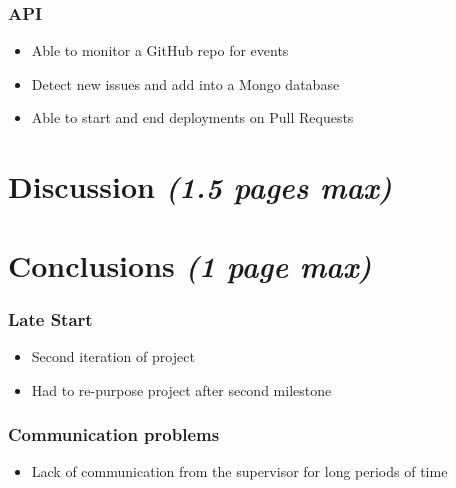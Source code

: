 \documentclass[12pt]{article}
\providecommand{\tightlist}{%
  \setlength{\itemsep}{0pt}\setlength{\parskip}{0pt}}
\begin{document}
\hypertarget{api}{%
\subsubsection{API}\label{api}}

\begin{itemize}
\tightlist
\item
  Able to monitor a GitHub repo for events
\item
  Detect new issues and add into a Mongo database
\item
  Able to start and end deployments on Pull Requests
\end{itemize}

\hypertarget{discussion-1.5-pages-max}{%
\section{\texorpdfstring{Discussion \emph{(1.5 pages
max)}}{Discussion (1.5 pages max)}}\label{discussion-1.5-pages-max}}

\hypertarget{conclusions-1-page-max}{%
\section{\texorpdfstring{Conclusions \emph{(1 page
max)}}{Conclusions (1 page max)}}\label{conclusions-1-page-max}}

\hypertarget{late-start}{%
\subsubsection{Late Start}\label{late-start}}

\begin{itemize}
\tightlist
\item
  Second iteration of project
\item
  Had to re-purpose project after second milestone
\end{itemize}

\hypertarget{communication-problems}{%
\subsubsection{Communication problems}\label{communication-problems}}

\begin{itemize}
\tightlist
\item
  Lack of communication from the supervisor for long periods of time
\end{itemize}
\end{document}
